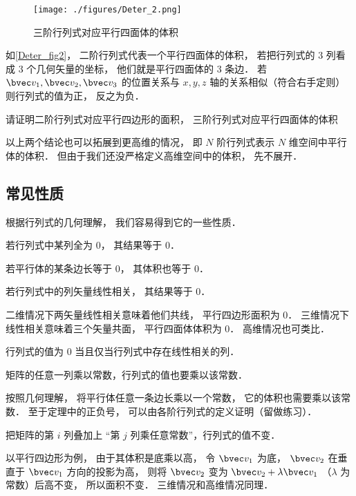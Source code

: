 \begin{figure}[ht]
\centering
\texttt{[image: ./figures/Deter\_2.png]}
\caption{三阶行列式对应平行四面体的体积} \label{Deter_fig2}
\end{figure}
如\autoref{Deter_fig2}， 二阶行列式代表一个平行四面体的体积， 若把行列式的 3 列看成 3 个几何矢量的坐标， 他们就是平行四面体的 3 条边． 若 $\bvec v_1, \bvec v_2, \bvec v_3$ 的位置关系与 $x, y, z$ 轴的关系相似（符合右手定则） 则行列式的值为正， 反之为负．

\begin{exercise}{}
请证明二阶行列式对应平行四边形的面积， 三阶行列式对应平行四面体的体积
\end{exercise}

以上两个结论也可以拓展到更高维的情况， 即 $N$ 阶行列式表示 $N$ 维空间中平行体的体积． 但由于我们还没严格定义高维空间中的体积， 先不展开．

\subsection{常见性质}
根据行列式的几何理解， 我们容易得到它的一些性质．

\begin{theorem}{ } \label{Deter_the1}
若行列式中某列全为 0， 其结果等于 0．
\end{theorem}
若平行体的某条边长等于 0， 其体积也等于 0．

\begin{theorem}{ }
若行列式中的列矢量线性相关， 其结果等于 0．
\end{theorem}
二维情况下两矢量线性相关意味着他们共线， 平行四边形面积为 0． 三维情况下线性相关意味着三个矢量共面， 平行四面体体积为 0． 高维情况也可类比．

\begin{theorem}{ } \label{Deter_the2}
行列式的值为 0 当且仅当行列式中存在线性相关的列．
\end{theorem}

\begin{theorem}{ } \label{Deter_the3}
矩阵的任意一列乘以常数，行列式的值也要乘以该常数．
\end{theorem}
按照几何理解， 将平行体任意一条边长乘以一个常数， 它的体积也需要乘以该常数． 至于定理中的正负号， 可以由各阶行列式的定义证明（留做练习）．

\begin{theorem}{ }
把矩阵的第 $i$ 列叠加上 “第 $j$ 列乘任意常数”，行列式的值不变．
\end{theorem}
以平行四边形为例， 由于其体积是底乘以高， 令 $\bvec v_1$ 为底， $\bvec v_2$ 在垂直于 $\bvec v_1$ 方向的投影为高， 则将 $\bvec v_2$ 变为 $\bvec v_2 + \lambda \bvec v_1$ （$\lambda$ 为常数）后高不变， 所以面积不变． 三维情况和高维情况同理．

